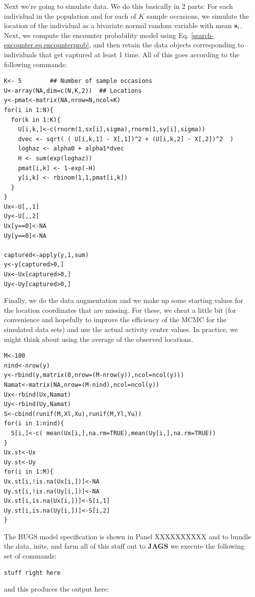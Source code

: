 Next we're going to simulate data. We do this basically in 2 parts:
For each individual in the population and for each of $K$ sample
occasions, we simulate the location of the individual as a bivariate
normal random variable with mean ${\bf s}_i$. Next, we compute the
encounter probability model using
Eq. \ref{search-encounter.eq.encounterprob}, and then retain the
data objects corresponding to individuals that get captured at least 1
time. All of this goes
according to the following commands:
\begin{verbatim}
K<- 5        ## Number of sample occasions 
U<-array(NA,dim=c(N,K,2))  ## Locations
y<-pmat<-matrix(NA,nrow=N,ncol=K)
for(i in 1:N){
  for(k in 1:K){
    U[i,k,]<-c(rnorm(1,sx[i],sigma),rnorm(1,sy[i],sigma))
    dvec <- sqrt( ( U[i,k,1] - X[,1])^2 + (U[i,k,2] - X[,2])^2  )
    loghaz <- alpha0 + alpha1*dvec
    H <- sum(exp(loghaz))
    pmat[i,k] <- 1-exp(-H)
    y[i,k] <- rbinom(1,1,pmat[i,k])
  }
}
Ux<-U[,,1]
Uy<-U[,,2]
Ux[y==0]<-NA
Uy[y==0]<-NA

captured<-apply(y,1,sum)
y<-y[captured>0,]
Ux<-Ux[captured>0,]
Uy<-Uy[captured>0,]
\end{verbatim}

Finally, we 
do the data augmentation and we make up some
starting values for the location coordinates that are missing.  For
these,
we cheat a little bit (for convenience and hopefully to improve the
efficiency of the MCMC
for the simulated data sets) and use the actual activity
center
values. In practice, we might think about using the average of the
observed
locations.
\begin{verbatim}
M<-100
nind<-nrow(y)
y<-rbind(y,matrix(0,nrow=(M-nrow(y)),ncol=ncol(y)))
Namat<-matrix(NA,nrow=(M-nind),ncol=ncol(y))
Ux<-rbind(Ux,Namat)
Uy<-rbind(Uy,Namat)
S<-cbind(runif(M,Xl,Xu),runif(M,Yl,Yu))
for(i in 1:nind){
  S[i,]<-c( mean(Ux[i,],na.rm=TRUE),mean(Uy[i,],na.rm=TRUE))
}
Ux.st<-Ux
Uy.st<-Uy
for(i in 1:M){
Ux.st[i,!is.na(Ux[i,])]<-NA
Uy.st[i,!is.na(Uy[i,])]<-NA
Ux.st[i,is.na(Ux[i,])]<-S[i,1]
Uy.st[i,is.na(Uy[i,])]<-S[i,2]
}
\end{verbatim}

The BUGS model specification is shown in Panel XXXXXXXXXX and to
bundle the data, inits, and farm
all of this stuff out to {\bf JAGS} we execute the following set of
commands:
\begin{verbatim}
stuff right here
\end{verbatim}
and this produces the output here:


